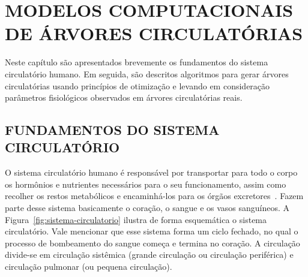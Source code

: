 \chapter{MODELOS COMPUTACIONAIS DE ÁRVORES CIRCULATÓRIAS}\label{chpt:modelos-de-arvores}

Neste capítulo são apresentados brevemente os fundamentos do sistema circulatório humano.
Em seguida, são descritos algoritmos para gerar árvores circulatórias usando princípios de 
otimização e levando em consideração parâmetros fisiológicos observados em árvores 
circulatórias reais.

\section{FUNDAMENTOS DO SISTEMA CIRCULATÓRIO}\label{sec:fisiologia-anatomia-sistema-circulatorio}

O sistema circulatório humano é responsável por transportar para todo o corpo os 
hormônios e nutrientes necessários para o seu funcionamento, assim como recolher 
os restos metabólicos e encaminhá-los para os órgãos excretores~\cite{Hall2011}. Fazem 
parte desse sistema basicamente o coração, o sangue e os vasos sanguíneos. A 
Figura~\ref{fig:sistema-circulatorio} ilustra de forma esquemática o sistema circulatório. Vale mencionar
que esse sistema forma um ciclo fechado, no qual o processo de bombeamento do sangue
começa e termina no coração. A circulação divide-se em circulação sistêmica (grande 
circulação ou circulação periférica) e circulação pulmonar (ou pequena circulação).

